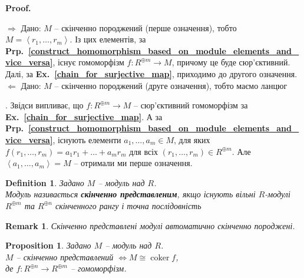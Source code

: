 \documentclass[a4paper, 10pt]{article}
\makeatletter
\def\rightproof{$\boxed{\Rightarrow}$ }
\def\leftproof{$\boxed{\Leftarrow}$ }
\theoremstyle{theoremdd}
\theoremstyle{theoremdd}
\newtheorem{definition}[theorem]{Definition}
\theoremstyle{theoremdd}
\theoremstyle{theoremdd}
\theoremstyle{theoremdd}
\theoremstyle{theoremdd}
\theoremstyle{theoremdd}
\theoremstyle{theoremdd}
\theoremstyle{theoremdd}
\newtheorem{proposition}[theorem]{Proposition}
\theoremstyle{theoremdd}
\theoremstyle{theoremdd}
\newtheorem{remark}[theorem]{Remark}
\theoremstyle{theoremdd}
\theoremstyle{theoremdd}
\theoremstyle{theoremdd}
\theoremstyle{theoremdd}
\renewenvironment{proof}[1][Proof.\\]{\par
\pushQED{\hfill \qed}%
\normalfont \topsep6\p@\@plus6\p@\relax
\trivlist
\item\relax
{\bfseries
#1\@addpunct{.}}\hspace\labelsep\ignorespaces
}{%
\popQED\endtrivlist\@endpefalse
}
\DeclareMathOperator{\coker}{coker}
\newcommand\exref[1]{\textbf{Ex.~\ref{#1}}}
\newcommand\prpref[1]{\textbf{Prp.~\ref{#1}}}
\makeatother
\begin{document}
\begin{proof}
\rightproof Дано: $M$ -- скінченно породжений (перше означення), тобто $M = \left< r_1,\dots,r_m\right>$. Із цих елементів, за \prpref{construct_homomorphism_based_on_module_elements_and_vice_versa}, існує гомоморфізм $f \colon R^{\oplus m} \to M$, причому це буде сюр'єктивний. Далі, за \exref{chain_for_surjective_map}, приходимо до другого означення.
\bigskip \\
\leftproof Дано: $M$ -- скінченно породжений (друге означення), тобто маємо ланцюг . Звідси випливає, що $f \colon R^{\oplus m} \to M$ -- сюр'єктивний гомоморфізм за \exref{chain_for_surjective_map}. А за \prpref{construct_homomorphism_based_on_module_elements_and_vice_versa}, існують елементи $a_1,\dots,a_m \in M$, для яких $f(r_1,\dots,r_m) = a_1r_1+\dots+a_mr_m$ для всіх $(r_1,\dots,r_m) \in R^{\oplus m}$. Але $\left< a_1,\dots,a_m \right> = M$ -- отримали ми перше означення.
\end{proof}

\begin{definition}
Задано $M$ -- модуль над $R$.\\
Модуль називається \textbf{скінченно представленим}, якщо існують вільні $R$-модулі $R^{\oplus m}$ та $R^{\oplus n}$ скінченного рангу і точна послідовність
\begin{figure}[H]
\centering
{}
\end{figure}
\end{definition}

\begin{remark}
Скінченно представлені модулі автоматично скінченно породжені.
\end{remark}

\begin{proposition}
Задано $M$ -- модуль над $R$.\\
$M$ -- скінченно представлений $\iff M \cong \coker f$, \\
де $f \colon R^{\oplus n} \to R^{\oplus m}$ -- гомоморфізм.
\end{proposition}
\end{document}
